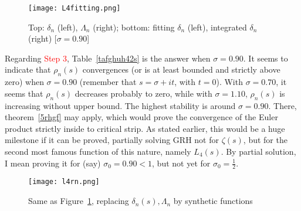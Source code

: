 \documentclass[oneside,10pt]{book}
\begin{document}
\begin{figure}[H]
\centering
\texttt{[image: L4fitting.png]}  
\caption{Top: $\delta_n$ (left), $\Lambda_n$ (right); bottom: fitting $\delta_n$ (left), integrated $\delta_n$ (right) [$\sigma=0.90$]}
\label{fig:lollog1xx}
\end{figure}

Regarding \textcolor{red}{Step 3}, Table~\ref{tafghuh42s} is the answer when $\sigma = 0.90$. It seems to indicate that $\rho_n(s)$
 convergences (or is at least bounded and strictly above zero) when $\sigma = 0.90$ (remember that $s=\sigma +it$, with $t=0$). 
With $\sigma=0.70$, it seems that $\rho_n(s)$ decreases probably to zero, while with $\sigma = 1.10$, $\rho_n(s)$ is increasing without upper bound.
 The highest stability is around $\sigma = 0.90$. There, theorem~\ref{5rhgf} may apply, which would prove the convergence of the Euler product strictly
 inside to critical strip. As stated earlier, this would be a huge milestone if it can be proved, partially solving GRH not for $\zeta(s)$, but for the second most famous function of this nature, namely $L_4(s)$. By partial solution, I mean proving it for (say) $\sigma_0 =0.90 <1$, but  not
 yet for $\sigma_0 = \frac{1}{2}$.

\begin{figure}[H]
\centering
\texttt{[image: l4rn.png]}  
\caption{Same as Figure~\ref{fig:lollog1xx}, replacing $\delta_n(s),\Lambda_n$ by synthetic functions}
\label{fig:lollo562}
\end{figure}

 
\end{document}
